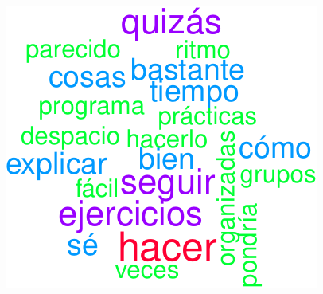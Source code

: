 \documentclass[
]{article}
\begin{document}
\includegraphics{informe_files/figure-latex/unnamed-chunk-17-1.pdf}
\end{document}
